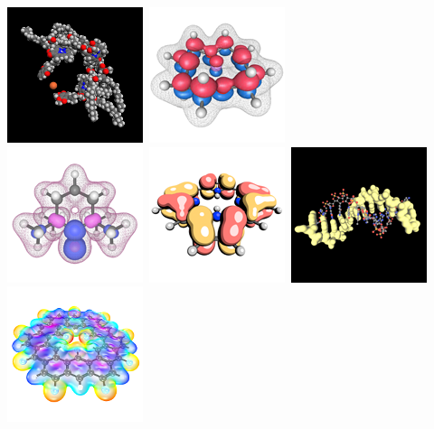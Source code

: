 \documentclass[a4paper,12pt]{article}
\begin{document}
\begin{center}
\includegraphics[scale=0.58]{figures/gallery/g20_sm.png}\
\includegraphics[scale=0.58]{figures/gallery/g6_sm.png} \\
\includegraphics[scale=0.58]{figures/gallery/g2_sm.png}\
\includegraphics[scale=0.58]{figures/gallery/g9_sm.png}\
\includegraphics[scale=0.58]{figures/gallery/g8_sm.png}\
\includegraphics[scale=0.58]{figures/gallery/g18_sm.png}\

\end{center}
\end{document}
